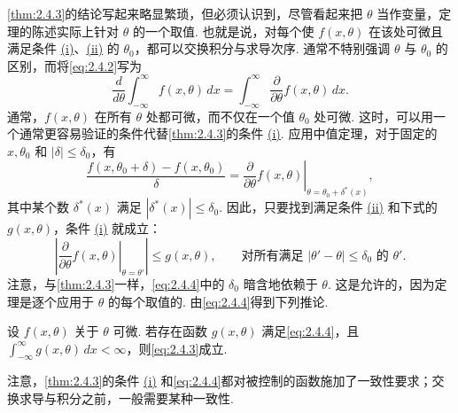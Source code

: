 \autoref{thm:2.4.3}的结论写起来略显繁琐，但必须认识到，尽管看起来把 $\theta$ 当作变量，定理的陈述实际上针对 $\theta$ 的一个取值.
也就是说，对每个使 $f(x,\theta)$ 在该处可微且满足条件 \hyperref[itm:thm:2.4.3:i]{(i)}、\hyperref[itm:thm:2.4.3:ii]{(ii)} 的 $\theta_0$，都可以交换积分与求导次序. 通常不特别强调 $\theta$ 与 $\theta_0$ 的区别，而将\eqref{eq:2.4.2}写为
\begin{equation}\label{eq:2.4.3}
\frac d{d\theta}\int_{-\infty}^\infty f(x,\theta)\,dx
=\int_{-\infty}^\infty\frac\partial{\partial\theta}f(x,\theta)\,dx.
\end{equation}
通常，$f(x,\theta)$ 在所有 $\theta$ 处都可微，而不仅在一个值 $\theta_0$ 处可微. 这时，可以用一个通常更容易验证的条件代替\autoref{thm:2.4.3}的条件 \hyperref[itm:thm:2.4.3:i]{(i)}. 应用中值定理，对于固定的 $x,\theta_0$ 和 $|\delta|\le\delta_0$，有
$$\frac{f(x,\theta_0+\delta)-f(x,\theta_0)}\delta
=\left.\frac\partial{\partial\theta}f(x,\theta)\right|_{\theta=\theta_0+\delta^*(x)},$$
其中某个数 $\delta^*(x)$ 满足 $|\delta^*(x)|\le\delta_0$. 因此，只要找到满足条件 \hyperref[itm:thm:2.4.3:ii]{(ii)} 和下式的 $g(x,\theta)$，条件 \hyperref[itm:thm:2.4.3:i]{(i)} 就成立：
\begin{equation}\label{eq:2.4.4}
\left|\left.\frac\partial{\partial\theta}f(x,\theta)\right|_{\theta=\theta'}\right|
\le g(x,\theta),\qquad\text{对所有满足 $|\theta'-\theta|\le\delta_0$ 的 $\theta'$}.
\end{equation}
注意，与\autoref{thm:2.4.3}一样，\eqref{eq:2.4.4}中的 $\delta_0$ 暗含地依赖于 $\theta$. 这是允许的，因为定理是逐个应用于 $\theta$ 的每个取值的. 由\eqref{eq:2.4.4}得到下列推论.
\begin{corollary}\label{cor:2.4.4}
设 $f(x,\theta)$ 关于 $\theta$ 可微. 若存在函数 $g(x,\theta)$ 满足\eqref{eq:2.4.4}，且 $\int_{-\infty}^\infty g(x,\theta)\,dx<\infty$，则\eqref{eq:2.4.3}成立.
\end{corollary}
注意，\autoref{thm:2.4.3}的条件 \hyperref[itm:thm:2.4.3:i]{(i)} 和\eqref{eq:2.4.4}都对被控制的函数施加了一致性要求；交换求导与积分之前，一般需要某种一致性.

